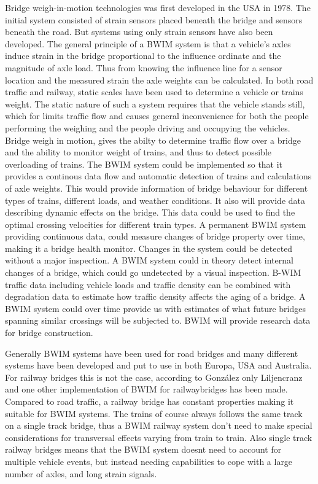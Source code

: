 Bridge weigh-in-motion technologies was first developed in the USA in 1978. The initial system consisted of strain sensors placed beneath the bridge and sensors beneath the road. But systems using only strain sensors have also been developed. The general principle of a BWIM system is that a vehicle's axles induce strain in the bridge proportional to the influence ordinate and the magnitude of axle load. Thus from knowing the influence line for a sensor location and the measured strain the axle weights can be calculated.
In both road traffic and railway, static scales have been used to determine a vehicle or trains weight. The static nature of such a system requires that the vehicle stands still, which for limits traffic flow and causes general inconvenience for both the people performing the weighing and the people driving and occupying the vehicles.
Bridge weigh in motion, gives the abilty to determine traffic flow over a bridge and the ability to monitor weight of trains, and thus to detect possible overloading of trains.
The BWIM system could be implemented so that it provides a continous data flow and automatic detection of trains and calculations of axle weights. This would provide information of bridge behaviour for different types of trains, different loads, and weather conditions. It also will provide data describing dynamic effects on the bridge. This data could be used to find the optimal crossing velocities for different train types.
A permanent BWIM system providing continuous data, could measure changes of bridge property over time, making it a bridge health monitor. Changes in the system could be detected without a major inspection. A BWIM system could in theory detect internal changes of a bridge, which could go undetected by a visual inspection.
B-WIM traffic data including vehicle loads and traffic density can be combined with degradation data to estimate how traffic density affects the aging of a bridge.
A BWIM system could over time provide us with estimates of what future bridges spanning similar crossings will be subjected to.
BWIM will provide research data for bridge construction.



Generally BWIM systems have been used for road bridges and many different systems have been developed and put to use in both Europa, USA and Australia. For railway bridges this is not the case, according to González \cite{gonzales_applications} only Liljencranz \cite{Liljencrantz} and one other implementation of BWIM for railwaybridges has been made.
Compared to road traffic, a railway bridge has constant properties making it suitable for BWIM systems. The trains of course always follows the same track on a single track bridge, thus a BWIM railway system don't need to make special considerations for transversal effects varying from train to train. Also single track railway bridges means that the BWIM system doesnt need to account for multiple vehicle events, but instead needing capabilities to cope with a large number of axles, and long strain signals.


